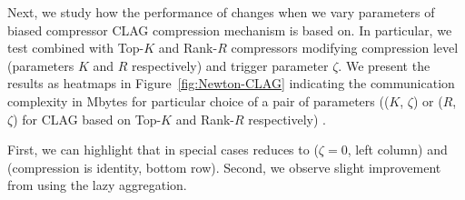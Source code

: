 \documentclass[11pt]{article}
\begin{document}
	Next, we study how the performance of  changes when we vary parameters of biased compressor CLAG compression mechanism is based on. In particular, we test  combined with Top-$K$ and Rank-$R$ compressors modifying compression level (parameters $K$ and $R$ respectively) and trigger parameter $\zeta$. We present the results as heatmaps in Figure~\ref{fig:Newton-CLAG} indicating the communication complexity in Mbytes for particular choice of a pair of parameters (($K$, $\zeta$) or ($R$, $\zeta$) for CLAG based on Top-$K$ and Rank-$R$ respectively) .
	
	First, we can highlight that in special cases  reduces to  ($\zeta=0$, left column) and  (compression is identity, bottom row). Second, we observe slight improvement from using the lazy aggregation. 
	
\end{document}
